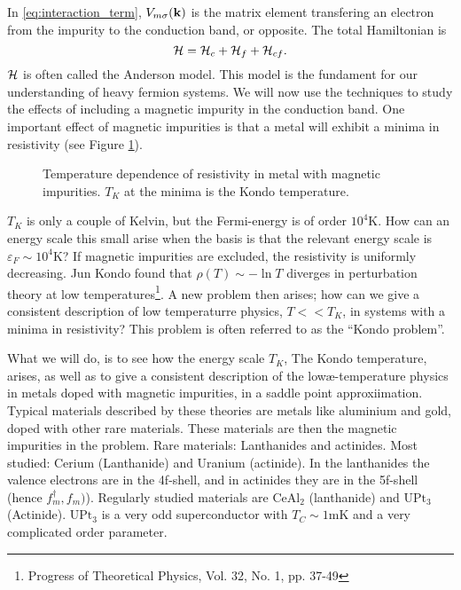 In \eqref{eq:interaction_term}, $V_{m\sigma}(\vb k) $ is the matrix element transfering an electron from the impurity to the conduction band, or opposite. 
The total Hamiltonian is
\begin{equation}
	\mathcal{H} = \mathcal{H}_c + \mathcal{H}_f + \mathcal{H}_{cf}.
\end{equation}
$\mathcal{H}$ is often called the Anderson model. This model is the fundament for our understanding of heavy fermion systems. We will now use the techniques to study the effects of including a magnetic impurity in the conduction band. 
One important effect of magnetic impurities is that a metal will exhibit a minima in resistivity (see Figure \ref{fig:resistivity}).
\begin{figure}
	\centering
	
	\caption{Temperature dependence of resistivity in metal with magnetic impurities. $T_K$ at the minima is the Kondo temperature.}
	\label{fig:resistivity}
\end{figure}
$T_K$ is only a couple of Kelvin, but the Fermi-energy is of order $10^4\mathrm{K}$. How can an energy scale this small arise when the basis is that the relevant energy scale is $\varepsilon_F \sim 10^4\mathrm{K}$? If magnetic impurities are excluded, the resistivity is uniformly decreasing. Jun Kondo found that $\rho(T) \sim -\ln T$ diverges in perturbation theory at low temperatures\footnote{Progress of Theoretical Physics, Vol. 32, No. 1, pp. 37-49}. A new problem then arises; how can we give a consistent description of low temperaturre physics, $T<<T_K$, in systems with a minima in resistivity? This problem is often referred to as the ``Kondo problem''. 

What we will do, is to see how the energy scale $T_K$, The Kondo temperature, arises, as well as to give a consistent description of the lowæ-temperature physics in metals doped with magnetic impurities, in a saddle point approxiimation.
Typical materials described by these theories are metals like aluminium and gold, doped with other rare materials. These materials are then the magnetic impurities in the problem. Rare materials: Lanthanides and actinides. Most studied: Cerium (Lanthanide) and Uranium (actinide). In the lanthanides the valence electrons are in the 4f-shell, and in actinides they are in the 5f-shell (hence $f_m^\dagger, f_m)$). Regularly studied materials are $\mathrm{CeAl_2}$ (lanthanide) and $\mathrm{UPt_3}$ (Actinide). $\mathrm{UPt_3}$ is a very odd superconductor with $T_C \sim 1\mathrm{mK}$ and a very complicated order parameter.  

